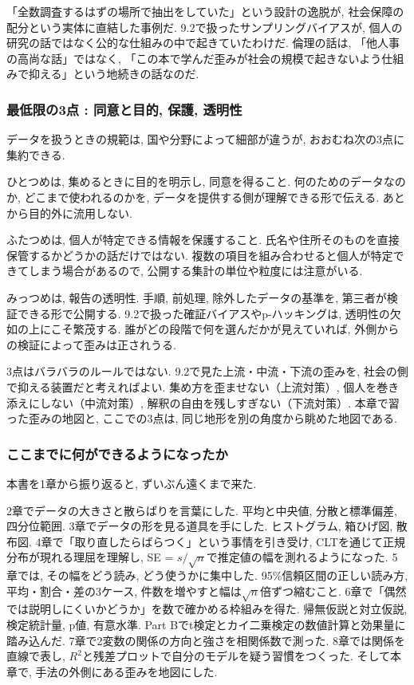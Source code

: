 「全数調査するはずの場所で抽出をしていた」という設計の逸脱が, 社会保障の配分という実体に直結した事例だ.
9.2で扱ったサンプリングバイアスが, 個人の研究の話ではなく公的な仕組みの中で起きていたわけだ.
倫理の話は, 「他人事の高尚な話」ではなく, 「この本で学んだ歪みが社会の規模で起きないよう仕組みで抑える」という地続きの話なのだ.

\subsubsection*{最低限の3点 : 同意と目的, 保護, 透明性}

データを扱うときの規範は, 国や分野によって細部が違うが, おおむね次の3点に集約できる.

ひとつめは, 集めるときに目的を明示し, 同意を得ること.
何のためのデータなのか, どこまで使われるのかを, データを提供する側が理解できる形で伝える.
あとから目的外に流用しない.

ふたつめは, 個人が特定できる情報を保護すること.
氏名や住所そのものを直接保管するかどうかの話だけではない.
複数の項目を組み合わせると個人が特定できてしまう場合があるので, 公開する集計の単位や粒度には注意がいる.

みっつめは, 報告の透明性. 手順, 前処理, 除外したデータの基準を, 第三者が検証できる形で公開する.
9.2で扱った確証バイアスやp-ハッキングは, 透明性の欠如の上にこそ繁茂する.
誰がどの段階で何を選んだかが見えていれば, 外側からの検証によって歪みは正されうる.

3点はバラバラのルールではない.
9.2で見た上流・中流・下流の歪みを, 社会の側で抑える装置だと考えればよい.
集め方を歪ませない（上流対策）, 個人を巻き添えにしない（中流対策）, 解釈の自由を残しすぎない（下流対策）.
本章で習った歪みの地図と, ここでの3点は, 同じ地形を別の角度から眺めた地図である.

\subsubsection*{ここまでに何ができるようになったか}

本書を1章から振り返ると, ずいぶん遠くまで来た.

2章でデータの大きさと散らばりを言葉にした. 平均と中央値, 分散と標準偏差, 四分位範囲.
3章でデータの形を見る道具を手にした. ヒストグラム, 箱ひげ図, 散布図.
4章で「取り直したらばらつく」という事情を引き受け, CLTを通じて正規分布が現れる理屈を理解し, SE = $s/\sqrt{n}$で推定値の幅を測れるようになった.
5章では, その幅をどう読み, どう使うかに集中した. 95\%信頼区間の正しい読み方, 平均・割合・差の3ケース, 件数を増やすと幅は$\sqrt{n}$倍ずつ縮むこと.
6章で「偶然では説明しにくいかどうか」を数で確かめる枠組みを得た. 帰無仮説と対立仮説, 検定統計量, p値, 有意水準. Part Bでt検定とカイ二乗検定の数値計算と効果量に踏み込んだ.
7章で2変数の関係の方向と強さを相関係数で測った. 8章では関係を直線で表し, $R^2$と残差プロットで自分のモデルを疑う習慣をつくった.
そして本章で, 手法の外側にある歪みを地図にした.

